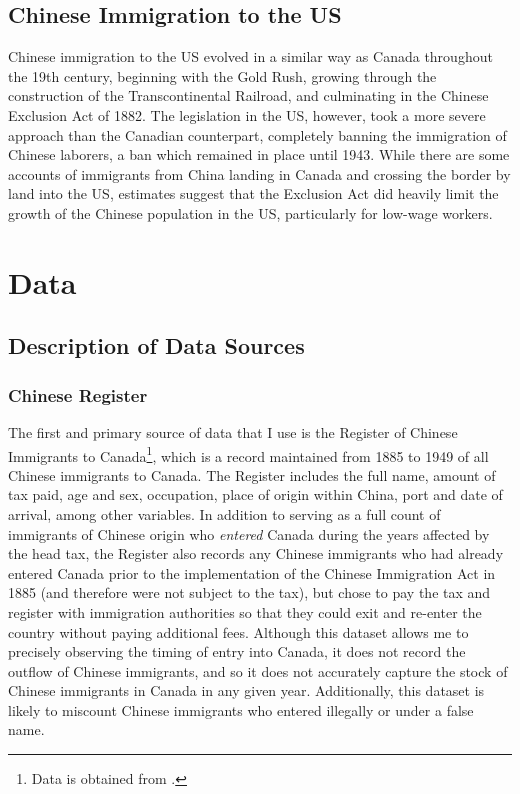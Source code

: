 \documentclass[12pt]{article}
\begin{document}
\subsection{Chinese Immigration to the US}
Chinese immigration to the US evolved in a similar way as Canada throughout the 19th century, beginning with the Gold Rush, growing through the construction of the Transcontinental Railroad, and culminating in the Chinese Exclusion Act of 1882.
The legislation in the US, however, took a more severe approach than the Canadian counterpart, completely banning the immigration of Chinese laborers, a ban which remained in place until 1943. 
While there are some accounts of immigrants from China landing in Canada and crossing the border by land into the US, estimates suggest that the Exclusion Act did heavily limit the growth of the Chinese population in the US, particularly for low-wage workers.

\section{Data}
\subsection{Description of Data Sources}

\subsubsection{Chinese Register}
The first and primary source of data that I use is the Register of Chinese Immigrants to Canada\footnote{Data is obtained from \citet{chineseregister}.}, 
which is a record maintained from 1885 to 1949 of all Chinese immigrants to Canada.
The Register includes the full name, amount of tax paid, age and sex, occupation, place of origin within China, port and date of arrival, among other variables. 
In addition to serving as a full count of immigrants of Chinese origin who \textit{entered} Canada during the years affected by the head tax,
the Register also records any Chinese immigrants who had already entered Canada prior to the implementation of the Chinese Immigration Act in 1885 (and therefore were not subject to the tax),
but chose to pay the tax and register with immigration authorities so that they could exit and re-enter the country without paying additional fees.
Although this dataset allows me to precisely observing the timing of entry into Canada, it does not record the outflow of Chinese immigrants, and so it does not accurately capture the stock of Chinese immigrants in Canada in any given year.
Additionally, this dataset is likely to miscount Chinese immigrants who entered illegally or under a false name.
\end{document}
